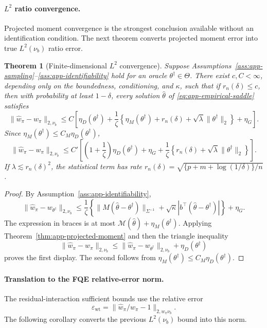 \documentclass{article}
\theoremstyle{plain}
\newtheorem{theorem}{Theorem}
\theoremstyle{definition}
\theoremstyle{remark}
\begin{document}
\paragraph{\(L^2\) ratio convergence.}
Projected moment convergence is the strongest conclusion available without an
identification condition. The next theorem converts projected moment error into
true \(L^2(\nu_b)\) ratio error.

\begin{theorem}[Finite-dimensional \(L^2\) convergence]
\label{thm:app-l2-linear}
Suppose Assumptions~\ref{ass:app-sampling}--\ref{ass:app-identifiability} hold
for an oracle \(\theta^\dagger\in\Theta\). There exist \(c,C<\infty\),
depending only on the boundedness, conditioning, and \(\kappa\), such that if
\(r_n(\delta)\le c\), then with probability at least \(1-\delta\), every
solution \(\widehat\theta\) of \eqref{eq:app-empirical-saddle} satisfies
\[
\|\widehat w_\pi-w_\pi\|_{2,\nu_b}
\le
C\left[
\eta_D(\theta^\dagger)
+\frac{1}{\zeta}
\left\{
\eta_M(\theta^\dagger)
+r_n(\delta)
+\sqrt{\lambda}\|\theta^\dagger\|_2
\right\}
+\eta_G
\right].
\]
Since \(\eta_M(\theta^\dagger)\le C_M\eta_D(\theta^\dagger)\),
\[
\|\widehat w_\pi-w_\pi\|_{2,\nu_b}
\le
C'\left[
\left(1+\frac{1}{\zeta}\right)\eta_D(\theta^\dagger)
+\eta_G
+\frac{1}{\zeta}
\left\{
r_n(\delta)+\sqrt{\lambda}\|\theta^\dagger\|_2
\right\}
\right].
\]
If \(\lambda\lesssim r_n(\delta)^2\), the statistical term has rate
\(r_n(\delta)=\sqrt{\{p+m+\log(1/\delta)\}/n}\).
\end{theorem}

\begin{proof}
By Assumption~\ref{ass:app-identifiability},
\[
\|\widehat w_\pi-w_{\theta^\dagger}\|_{2,\nu_b}
\le
\frac{1}{\zeta}
\left\{
\|M(\widehat\theta-\theta^\dagger)\|_{\Sigma^{-1}}
+\sqrt{\kappa}|b^\top(\widehat\theta-\theta^\dagger)|
\right\}
+\eta_G .
\]
The expression in braces is at most
\(\mathcal M(\widehat\theta)+\eta_M(\theta^\dagger)\). Applying
Theorem~\ref{thm:app-projected-moment} and then the triangle inequality
\[
\|\widehat w_\pi-w_\pi\|_{2,\nu_b}
\le
\|\widehat w_\pi-w_{\theta^\dagger}\|_{2,\nu_b}
+\eta_D(\theta^\dagger)
\]
proves the first display. The second follows from
\(\eta_M(\theta^\dagger)\le C_M\eta_D(\theta^\dagger)\).
\end{proof}

\paragraph{Translation to the FQE relative-error norm.}
The residual-interaction sufficient bounds use the relative error
\[
\varepsilon_{\mathrm{wt}}
=
\|\widehat w_\pi/w_\pi-1\|_{2,w_\pi\nu_b}.
\]
The following corollary converts the previous \(L^2(\nu_b)\) bound into this
norm.
\end{document}
